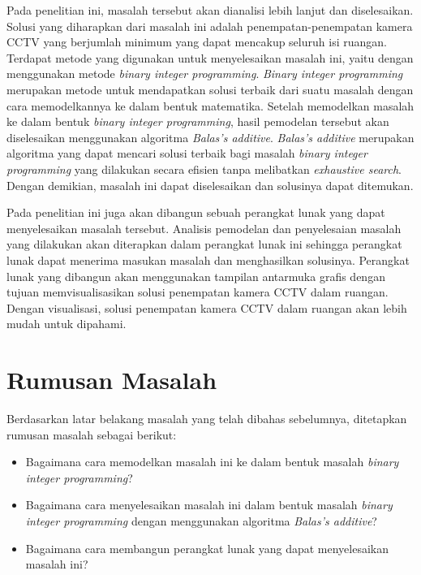 Pada penelitian ini, masalah tersebut akan dianalisi lebih lanjut dan diselesaikan. Solusi yang diharapkan dari masalah ini adalah penempatan-penempatan kamera CCTV yang berjumlah minimum yang dapat mencakup seluruh isi ruangan. Terdapat metode yang digunakan untuk menyelesaikan masalah ini, yaitu dengan menggunakan metode \textit{binary integer programming}. \textit{Binary integer programming} merupakan metode untuk mendapatkan solusi terbaik dari suatu masalah dengan cara memodelkannya ke dalam bentuk matematika. Setelah memodelkan masalah ke dalam bentuk \textit{binary integer programming}, hasil pemodelan tersebut akan diselesaikan menggunakan algoritma \textit{Balas's additive}. \textit{Balas's additive} merupakan algoritma yang dapat mencari solusi terbaik bagi masalah \textit{binary integer programming} yang dilakukan secara efisien tanpa melibatkan \textit{exhaustive search}. Dengan demikian, masalah ini dapat diselesaikan dan solusinya dapat ditemukan. 

Pada penelitian ini juga akan dibangun sebuah perangkat lunak yang dapat menyelesaikan masalah tersebut. Analisis pemodelan dan penyelesaian masalah yang dilakukan akan diterapkan dalam perangkat lunak ini sehingga perangkat lunak dapat menerima masukan masalah dan menghasilkan solusinya. Perangkat lunak yang dibangun akan menggunakan tampilan antarmuka grafis dengan tujuan memvisualisasikan solusi penempatan kamera CCTV dalam ruangan. Dengan visualisasi, solusi penempatan kamera CCTV dalam ruangan akan lebih mudah untuk dipahami.

\section{Rumusan Masalah}
\label{sec:rumusan}

Berdasarkan latar belakang masalah yang telah dibahas sebelumnya, ditetapkan rumusan masalah sebagai berikut:

\begin{itemize}
	\item Bagaimana cara memodelkan masalah ini ke dalam bentuk masalah \textit{binary integer programming}?
	\item Bagaimana cara menyelesaikan masalah ini dalam bentuk masalah \textit{binary integer programming} dengan menggunakan algoritma \textit{Balas's additive}?
	\item Bagaimana cara membangun perangkat lunak yang dapat menyelesaikan masalah ini?
\end{itemize}

